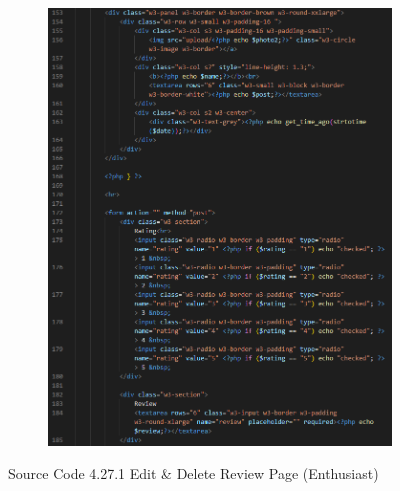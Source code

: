 \begin{enumerate}[1.]
\begin{figure}[h]
\begin{subfigure}[b]{0.6\textwidth}
            \centering
            \includegraphics[width=\textwidth]{mainmatter/images/frontend/code/eeditereview2.png}
            \label{fig:sub2}
        \end{subfigure}
        \caption*{Source Code 4.27.1 Edit \& Delete Review Page (Enthusiast)}
        \label{fig:myfig66a}
    \end{figure}
    \begin{figure}[h]\ContinuedFloat
        \centering
        \begin{subfigure}[b]{0.7\textwidth}
            \centering

\end{subfigure}
\end{figure}
\end{enumerate}
